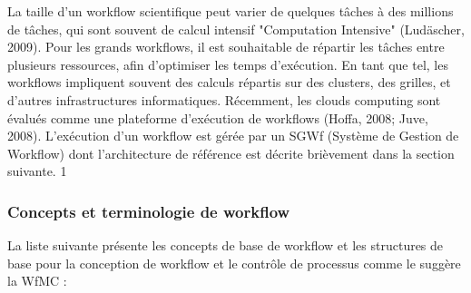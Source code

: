 La taille d’un workflow scientifique peut varier de quelques tâches à des millions de tâches, qui sont souvent de calcul intensif "Computation Intensive" (Ludäscher, 2009).  Pour les grands workflows, il est souhaitable de répartir les tâches entre plusieurs ressources, afin d’optimiser les temps d’exécution. En tant que tel, les workflows impliquent souvent  des calculs répartis sur des clusters, des grilles, et d'autres infrastructures informatiques. Récemment, les clouds computing  sont évalués comme une plateforme d'exécution de workflows (Hoffa, 2008; Juve, 2008). L’exécution d’un workflow est gérée par un SGWf (Système de Gestion de Workflow) dont l’architecture de référence est décrite brièvement dans la section suivante. 
1

\subsubsection{Concepts et terminologie de workflow}
  La liste suivante présente les concepts de base de workflow et les structures de base pour la conception de workflow et le contrôle de processus comme le suggère la WfMC \parencite{WFMC}:
  
